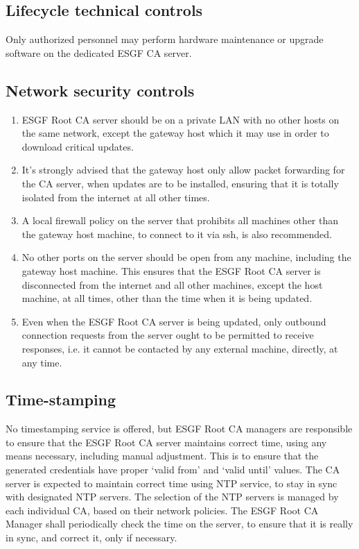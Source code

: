 \subsection{Lifecycle technical controls}\label{life-cycle-technical-controls}

Only authorized personnel may perform hardware maintenance or upgrade software on the dedicated ESGF CA server.

\subsection{Network security controls}\label{network-security-controls}
\begin{enumerate}
\item ESGF Root CA server should be on a private LAN with no other hosts on the same network, except the gateway host which it may use in order to download critical updates.
\item It's strongly advised that the gateway host only allow packet forwarding for the CA server, when updates are to be installed, ensuring that it is totally isolated from the internet at all other times. 
\item A local firewall policy on the server that prohibits all machines other than the gateway host machine, to connect to it via ssh, is also recommended. 
\item No other ports on the server should be open from any machine, including the gateway host machine. This ensures that the ESGF Root CA server is disconnected from the internet and all other machines, except the host machine, at all times, other than the time when it is being updated.
\item Even when the ESGF Root CA server is being updated, only outbound connection requests from the server ought to be  permitted to receive responses, i.e. it cannot be contacted by any external machine, directly, at any time.
\end{enumerate}

\subsection{Time-stamping}\label{time-stamping}

No timestamping service is offered, but ESGF Root CA managers are responsible to ensure that the ESGF Root CA server maintains correct time, using any means necessary, including manual adjustment. This is to ensure that the generated credentials have proper `valid from' and `valid until' values.
The CA server is expected to maintain correct time using NTP service, to stay in sync with designated NTP servers. The selection of the NTP servers is managed by each individual CA, based on their network policies. The ESGF Root CA Manager shall periodically check the time on the server, to ensure that it is really in sync, and correct it, only if necessary.


